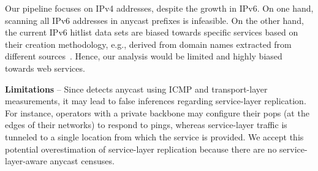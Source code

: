 Our pipeline focuses on IPv4 addresses, despite the growth in IPv6.
On one hand, scanning all IPv6 addresses in anycast prefixes is infeasible.
On the other hand, the current IPv6 hitlist data sets are biased towards specific services based on their creation methodology, e.g., derived from domain names extracted from different sources~\cite{gasser2016ipv6scanning,openintel}.
Hence, our analysis would be limited and highly biased towards web services.

\vspace{0.2em}\noindent\textbf{Limitations} -- 
Since \laces detects anycast using ICMP and transport-layer measurements,
it may lead to false inferences regarding service-layer replication.
%
For instance, operators with a private backbone may configure their \glspl{pop}
(at the edges of their networks) to respond to pings,
whereas service-layer traffic is tunneled to a single location from which the service is provided.
%
We accept this potential overestimation of service-layer replication
because there are no service-layer-aware anycast censuses.


